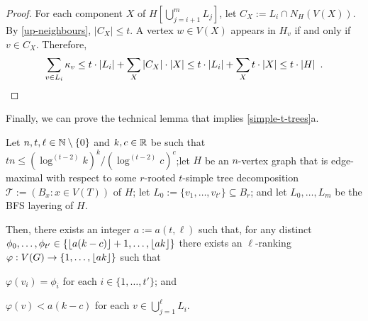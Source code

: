 \documentclass[kpfonts]{patmorin}
\theoremstyle{named}
\newcommand{\weirdref}[2]{\cref{#1}#2}
\begin{document}
\begin{proof}
    For each component $X$ of $H[\bigcup_{j=i+1}^m L_j]$, let $C_X:=L_i\cap N_H(V(X))$.  By \cref{up-neighbours}, $|C_X|\le t$. A vertex $w\in V(X)$ appears in $H_v$ if and only if $v\in C_X$.  Therefore,
    \[
        \sum_{v\in L_i} \kappa_v \le t\cdot|L_i| + \sum_{X}|C_X|\cdot|X| \le t\cdot|L_i| + \sum_{X}t\cdot|X|\le t\cdot|H| \enspace .  \qedhere
    \]
\end{proof}

Finally, we can prove the technical lemma that implies \weirdref{simple-t-trees}{a}.

\begin{lem}\label{t-tree-technical}
    Let $n,t,\ell\in\mathbb{N}\setminus\{0\}$ and $k, c\in\mathbb{R}$ be such that $tn\le (\log^{(t-2)} k)^k/(\log^{(t-2)} c)^{c}$;let $H$ be an $n$-vertex graph that is edge-maximal with respect to some $r$-rooted $t$-simple tree decomposition $\mathcal{T}:=(B_x:x\in V(T))$ of $H$; let $L_0:=\{v_1,\ldots,v_{t'}\}\subseteq B_r$; and let $L_0,\ldots,L_m$ be the BFS layering of $H$.

    Then, there exists an integer $a:=a(t,\ell)$ such that, for any distinct $\phi_0,\ldots,\phi_{t'}\in \{{\lfloor a(k-c) \rfloor}+1,\ldots,{\lfloor ak \rfloor}\}$ there exists an $\ell$-ranking $\varphi:V(G)\to\{1,\ldots,{\lfloor ak \rfloor}\}$ such that
    \begin{compactenum}[(R1)]
        \item $\varphi(v_i)=\phi_i$ for each $i\in\{1,\ldots,t'\}$; and
        \item $\varphi(v)<a(k-c)$ for each $v\in\bigcup_{j=1}^{\ell} L_i$.
    \end{compactenum}
\end{lem}
\end{document}
